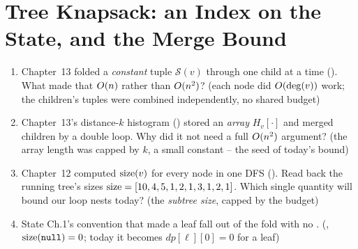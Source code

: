\section{Tree Knapsack: an Index on the State, and the Merge Bound}\label{sec:c27-knapsack}

\begin{previouslybox}
\begin{enumerate}[nosep, leftmargin=1.6em]
  \item Chapter~13 folded a \emph{constant} tuple $\mathcal S(v)$ through one
        child at a time (). What made that
        $O(n)$ rather than $O(n^2)$? (each node did $O(\deg(v))$
        work; the children's tuples were combined independently, no shared
        budget)
  \item Chapter~13's distance-$k$ histogram () stored an
        \emph{array} $H_v[\cdot]$ and merged children by a double loop. Why
        did it not need a full $O(n^2)$ argument? (the array length was
        capped by $k$, a small constant -- the seed of today's bound)
  \item Chapter~12 computed $\operatorname{size}(v)$ for every node in one DFS
        (). Read back the running tree's sizes
        $\operatorname{size}=[10,4,5,1,2,1,3,1,2,1]$. Which single quantity will bound our
        loop nests today? (the \emph{subtree size}, capped by the budget)
  \item State Ch.1's convention that made a leaf fall out of the fold with no
        . (, $\operatorname{size}(\texttt{null})=0$; today it
        becomes $\mathit{dp}[\ell][0]=0$ for a leaf)
\end{enumerate}
\end{previouslybox}

